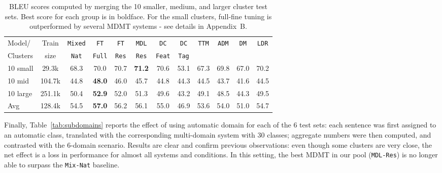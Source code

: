 \documentclass[11pt,a4paper]{article}
\newcommand{\fyTodo}[1]{\Todo[FY:]{\textcolor{orange}{#1}}}
\newcommand{\revision}[1]{#1}
\newcommand{\system}[1]{\texttt{{#1}}}
\begin{document}
\begin{table*}[t]
\centering \footnotesize
\revision{
  \begin{tabular}{|p{1.3cm}|*{11}{c|}} \hline
   Model/ & Train &\system{Mixed}&\system{FT}&\system{FT}&\system{MDL}&\system{DC}&\system{DC}&\multirow{2}{*}{\system{TTM}}&\multirow{2}{*}{\system{ADM}}&\multirow{2}{*}{\system{DM}}&\multirow{2}{*}{\system{LDR}}  \\ 
   Clusters & size & \system{Nat} & \system{Full} & \system{Res} &\system{Res} & \system{Feat}& \system{Tag}& & & & \\ \hline
10 small&29.3k&68.3&70.0&70.7&\bf 71.2&70.6&53.1&67.3&69.8&67.0&70.2\\
10 mid&104.7k&44.8&\bf 48.0&46.0&45.7&44.8&44.3&44.5&43.7&41.6&44.5\\
10 large&251.1k&50.4&\bf 52.9&52.0&51.3&49.6&43.2&49.1&48.5&44.3&49.5\\
Avg&128.4k&54.5&\bf 57.0&56.2&56.1&55.0&46.9&53.6&54.0&51.0&54.7\\ \hline
  \end{tabular}
   \caption{BLEU scores computed by merging the 10 smaller, medium, and larger cluster test sets. Best score for each group is in boldface. For the small clusters, full-fine tuning is outperformed by several MDMT systems - see details in Appendix~B.}
   \label{tab:avg_automatic_domains}}
\end{table*}
Finally, Table~\ref{tab:subdomains} reports the effect of using automatic domain for each of the 6 test sets: each sentence was first assigned to an automatic class, translated with the corresponding multi-domain system with 30 classes; aggregate numbers were then computed, and contrasted with the 6-domain scenario. Results are clear and confirm previous observations: even though some clusters are very close, the net effect is a loss in performance for almost all systems and conditions. In this setting, the best MDMT in our pool (\system{MDL-Res}) is no longer able to surpass the \system{Mix-Nat} baseline.%
\end{document}
